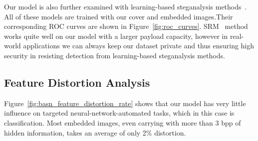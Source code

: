 Our model is also further examined with learning-based steganalysis methods~\cite{SPAM,SRM,Yedroudj}. All of these models are trained with our cover and embedded images.Their corresponding ROC curves are shown in Figure~\ref{fig:roc_curves}. SRM~\cite{SRM} method works quite well on our model with a larger payload capacity, however in real-world applications we can always keep our dataset private and thus ensuring high security in resisting detection from learning-based steganalysis methods.

\figureROCCurves%

\subsection{Feature Distortion Analysis}

Figure~\ref{fig:basn_feature_distortion_rate} shows that our model has very little influence on targeted neural-network-automated tasks, which in this case is classification. Most embedded images, even carrying with more than 3 bpp of hidden information, takes an average of only 2\% distortion.

\figureBASNFeatureDistortionRate%

